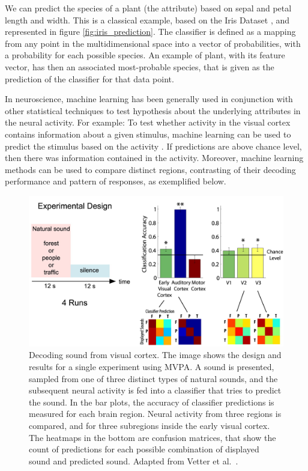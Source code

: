         We can predict the species of a plant (the attribute) based on sepal and petal length and width. This is a classical example, based on the Iris Dataset \cite{fisher1936use}, and represented in figure \ref{fig:iris_prediction}. The classifier is defined as a mapping from any point in the multidimensional space into a vector of probabilities, with a probability for each possible species. An example of plant, with its feature vector, has then an associated most-probable species, that is given as the prediction of the classifier for that data point.
        
        In neuroscience, machine learning has been generally used in conjunction with other statistical techniques to test hypothesis about the underlying attributes in the neural activity. For example: To test whether activity in the visual cortex contains information about a given stimulus, machine learning can be used to predict the stimulus based on the activity \cite{vetter2014decoding}. If predictions are above chance level, then there was information contained in the activity. Moreover, machine learning methods can be used to compare distinct regions, contrasting of their decoding performance and pattern of responses, as exemplified below.
        
        \begin{figure}
            \centering
            \includegraphics[width=\textwidth]{figures/sketches/sound_prediction_tiny.png}
            \caption[Decoding sound from visual cortex]{Decoding sound from visual cortex. The image shows the design and results for a single experiment using MVPA. A sound is presented, sampled from one of three distinct types of natural sounds, and the subsequent neural activity is fed into a classifier that tries to predict the sound. In the bar plots, the accuracy of classifier predictions is measured for each brain region. Neural activity from three regions is compared, and for three subregions inside the early visual cortex. The heatmaps in the bottom are confusion matrices, that show the count of predictions for each possible combination of displayed sound and predicted sound. Adapted from Vetter et al.~\cite{vetter2014decoding}.}
            \label{fig:prediction_neuro}
        \end{figure}
        
